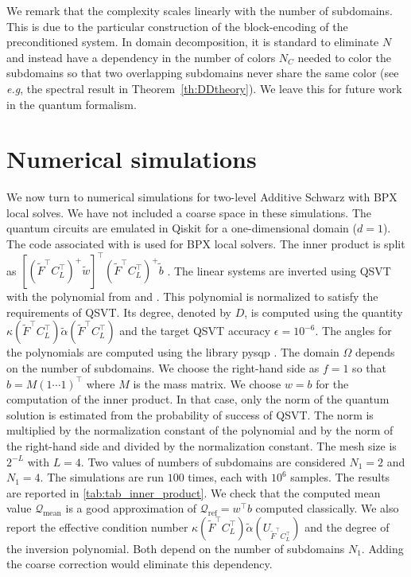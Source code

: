 \documentclass[onefignum,onetabnum]{siamart251216}
\begin{document}
We remark that the complexity scales linearly with the number of subdomains. This is due to the particular construction of the block-encoding of the preconditioned system. In domain decomposition, it is standard to eliminate $N$ and instead have a dependency in the number of colors $N_C$ needed to color
the subdomains so that two overlapping subdomains never share the same color (see \textit{e.g}, the spectral result in Theorem~\ref{th:DDtheory}). We leave this for future work in the quantum formalism. 


\section{Numerical simulations}
\label{sec:numerical}
We now turn to numerical simulations for two-level Additive Schwarz with BPX local solves. We have not included a coarse space in these simulations. The quantum circuits are emulated in Qiskit \cite{qiskit2024} for a one-dimensional domain ($d=1$). The code associated with \cite{Deiml_2025} is used for BPX local solvers. The inner product is split as $\left[(\tilde{F}^\top C_L^\top)^+ \tilde{w} \right]^\top (\tilde{F}^\top C_L^\top)^+ \tilde{b}$ \cite{Deiml_2025}. The linear systems are inverted using QSVT with the polynomial from \cite[Lemma 17-19]{zbMATH06823707} and \cite[Lemma 40]{Gily_n_2019}. This polynomial is normalized to satisfy the requirements of QSVT. Its degree, denoted by $D$, is computed using the quantity $\kappa(\tilde{F}^\top C_L^\top) \tilde{\alpha}(\tilde{F}^\top C_L^\top)$ and the target QSVT accuracy $\epsilon=10^{-6}$. The angles for the polynomials are computed using the library pysqp \cite{mrtc_unification_21,cdghs_finding_qsp_angles_20,dmwl_efficient_phases_21}. The domain $\Omega$ depends on the number of subdomains. We choose the right-hand side as $f=1$ so that $b=M (1 \cdots 1)^\top$ where $M$ is the mass matrix. We choose $w=b$ for the computation of the inner product. In that case, only the norm of the quantum solution is estimated from the probability of success of QSVT. The norm is multiplied by the normalization constant of the polynomial and by the norm of the right-hand side and divided by the normalization constant. The mesh size is $2^{-L}$ with $L=4$. Two values of numbers of subdomains are considered $N_1 = 2$ and $N_1=4$. The simulations are run $100$ times, each with $10^6$ samples. The results are reported in \cref{tab:tab_inner_product}. We check that the computed mean value $\mathcal{Q}_{\text{mean}}$ is a good approximation of $\mathcal{Q}_{\text{ref}}=w^\top b$ computed classically. We also report the effective condition number $\kappa(\tilde{F}^\top C_L^\top) \tilde{\alpha}(U_{\tilde{F}^\top C_L^\top})$ and the degree of the inversion polynomial. Both depend on  the number of subdomains $N_1$. Adding the coarse correction would eliminate this dependency.
\end{document}
